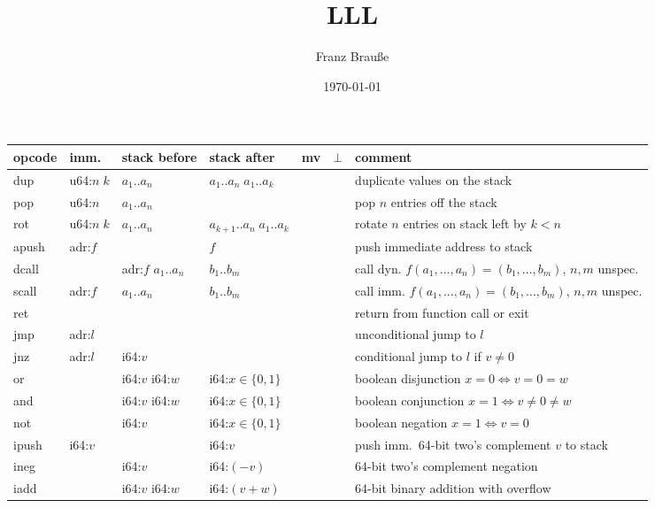 \documentclass[a4paper,parskip=half]{scrartcl}
\author{Franz Brauße}
\title{LLL}
\date{\today}
\begin{document}
\begin{figure}[h]
\centering
\begin{tabular}{l|l|l|l@{\;\,\vline\,}c@{\,\vline\,}c@{\,\vline\;\,}l}
  opcode & imm. & stack before & stack after & mv & $\bot$ & comment \\ \hline
  \ttfamily dup & u64:$n\;k$ & $a_1..a_n$ & $a_1..a_n\;a_1..a_k$     &&& duplicate values on the stack \\
  \ttfamily pop & u64:$n$    & $a_1..a_n$ &                          &&& pop $n$ entries off the stack \\
  \ttfamily rot & u64:$n\;k$ & $a_1..a_n$ & $a_{k+1}..a_n\;a_1..a_k$ &&& rotate $n$ entries on stack left by $k<n$ \\
  \hline
  \ttfamily apush & adr:$f$ &                    & $f$        &&& push immediate address to stack \\
  \ttfamily dcall &         & adr:$f$ $a_1..a_n$ & $b_1..b_m$ &&& call dyn. $f(a_1,\ldots,a_n) = (b_1,\ldots,b_m)$, $n,m$ unspec. \\
  \ttfamily scall & adr:$f$ & $a_1..a_n$         & $b_1..b_m$ &&& call imm. $f(a_1,\ldots,a_n) = (b_1,\ldots,b_m)$, $n,m$ unspec. \\
  \ttfamily ret   &         &                    &            &&& return from function call or exit \\
  \ttfamily jmp   & adr:$l$ &                    &            &&& unconditional jump to $l$ \\
  \ttfamily jnz   & adr:$l$ & i64:$v$            &            &&& conditional jump to $l$ if $v\neq 0$ \\
  \hline
  \ttfamily or    &         & i64:$v$ i64:$w$ & i64:$x\in\{0,1\}$ &&& boolean disjunction $x=0\iff v=0=w$ \\
  \ttfamily and   &         & i64:$v$ i64:$w$ & i64:$x\in\{0,1\}$ &&& boolean conjunction $x=1\iff v\neq0\neq w$ \\
  \ttfamily not   &         & i64:$v$         & i64:$x\in\{0,1\}$ &&& boolean negation $x=1\iff v=0$ \\
  \hline
  \ttfamily ipush & i64:$v$ &                 & i64:$v$          && & push imm.\ 64-bit two's complement $v$ to stack \\
  \ttfamily ineg  &         & i64:$v$         & i64:$(-v)$       && & 64-bit two's complement negation \\
  \ttfamily iadd  &         & i64:$v$ i64:$w$ & i64:$(v+w)$      && & 64-bit binary addition with overflow \\

\end{tabular}
\end{figure}
\end{document}
